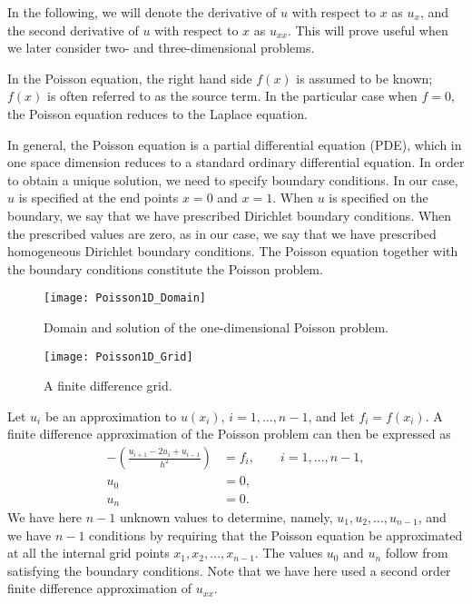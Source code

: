 In the following, we will denote the derivative of $u$ with respect to $x$ as
$u_x$, and the second derivative of $u$ with respect to $x$ as $u_{xx}$. This
will prove useful when we later consider two- and three-dimensional problems.

In the Poisson equation, the right hand side $f(x)$ is assumed to be known;
$f(x)$ is often referred to as the source term. In the particular case when
$f=0$, the Poisson equation reduces to the Laplace equation.

In general, the Poisson equation is a partial differential equation (PDE), which
in one space dimension reduces to a standard ordinary differential equation. In
order to obtain a unique solution, we need to specify boundary conditions. In
our case, $u$ is specified at the end points $x=0$ and $x=1$. When $u$ is
specified on the boundary, we say that we have prescribed Dirichlet boundary
conditions. When the prescribed values are zero, as in our case, we say that we
have prescribed homogeneous Dirichlet boundary conditions. The Poisson equation
together with the boundary conditions constitute the Poisson problem.

\begin{figure}
  \centering
  \texttt{[image: Poisson1D\_Domain]}
  \caption{Domain and solution of the one-dimensional Poisson problem.}
  \label{fig:Poisson1D_Domain}
\end{figure}

\begin{figure}
  \centering
  \texttt{[image: Poisson1D\_Grid]}
  \caption{A finite difference grid.}
  \label{fig:Poisson1D_Grid}
\end{figure}

Let $u_i$ be an approximation to $u(x_i)$, $i=1,\ldots,n-1$, and let $f_i =
f(x_i)$. A finite difference approximation of the Poisson problem can then be
expressed as
\begin{align}
  -\left( \frac{u_{i+1} - 2u_i + u_{i-1}}{h^2} \right) &= f_i, \qquad i=1,\ldots,n-1,
  \label{eq:Poisson_int_1d}\\
  u_0 &= 0, \\
  u_{n} &= 0.
\end{align}
We have here $n-1$ unknown values to determine, namely, $u_1, u_2, \ldots,
u_{n-1}$, and we have $n-1$ conditions by requiring that the Poisson equation be
approximated at all the internal grid points $x_1, x_2, \ldots,x_{n-1}$. The
values $u_0$ and $u_{n}$ follow from satisfying the boundary conditions. Note
that we have here used a second order finite difference approximation of
$u_{xx}$.


